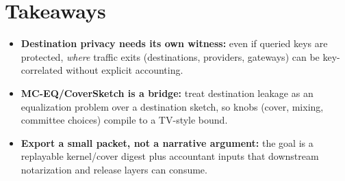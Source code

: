 \documentclass[11pt]{article}
\begin{document}
\section{Takeaways}
\begin{itemize}[leftmargin=*]
\item \textbf{Destination privacy needs its own witness:} even if queried keys are protected, \emph{where} traffic exits (destinations, providers, gateways) can be key-correlated without explicit accounting.
\item \textbf{MC-EQ/CoverSketch is a bridge:} treat destination leakage as an equalization problem over a destination sketch, so knobs (cover, mixing, committee choices) compile to a TV-style bound.
\item \textbf{Export a small packet, not a narrative argument:} the goal is a replayable kernel/cover digest plus accountant inputs that downstream notarization and release layers can consume.
\end{itemize}
\end{document}
